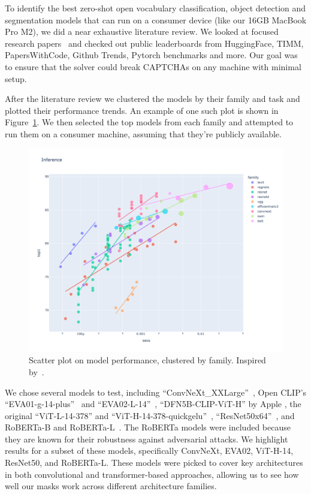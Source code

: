 \documentclass[a4paper, oneside]{discothesis}
\begin{document}
To identify the best zero-shot open vocabulary classification, object detection and segmentation models that can run on a consumer device (like our 16GB MacBook Pro M2), we did a near exhaustive literature review. We looked at focused research papers~\cite{wang2024benchmarking, goldblum2024battle} and checked out public leaderboards from HuggingFace, TIMM, PapersWithCode, Github Trends, Pytorch benchmarks and more. Our goal was to ensure that the solver could break CAPTCHAs on any machine with minimal setup.

After the literature review we clustered the models by their family and task and plotted their performance trends. An example of one such plot is shown in Figure~\ref{fig:families}. We then selected the top models from each family and attempted to run them on a consumer machine, assuming that they're publicly available.

\begin{figure}
	\centering
	\includegraphics[width=0.7\columnwidth]{figures/eval-families.png}
	\caption{Scatter plot on model performance, clustered by family. Inspired by~\cite{howard_image_models}.}
	\label{fig:families}
\end{figure}

We chose several models to test, including ``ConvNeXt\_XXLarge''~\cite{Liu_2022_CVPR}, Open CLIP's ``EVA01-g-14-plus''~\cite{Fang_2023_CVPR} and ``EVA02-L-14''~\cite{fang2024eva}, ``DFN5B-CLIP-ViT-H'' by Apple \cite{fang2023data}, the original ``ViT-L-14-378'' and ``ViT-H-14-378-quickgelu''~\cite{dosovitskiy2021imageworth16x16words}, ``ResNet50x64''~\cite{He_2015_ICCV}, and RoBERTa-B and RoBERTa-L~\cite{conneau2020unsupervisedcrosslingualrepresentationlearning}. The RoBERTa models were included because they are known for their robustness against adversarial attacks. We highlight results for a subset of these models, specifically ConvNeXt, EVA02, ViT-H-14, ResNet50, and RoBERTa-L. These models were picked to cover key architectures in both convolutional and transformer-based approaches, allowing us to see how well our masks work across different architecture families.
\end{document}

